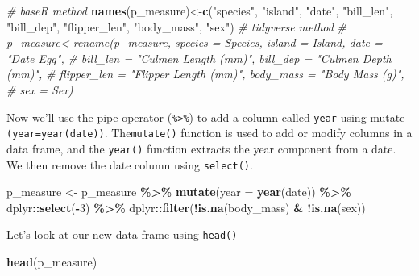 \documentclass[
]{book}
\newenvironment{Shaded}{\begin{snugshade}}{\end{snugshade}}
\newcommand{\AttributeTok}[1]{\textcolor[rgb]{0.13,0.29,0.53}{#1}}
\newcommand{\CommentTok}[1]{\textcolor[rgb]{0.56,0.35,0.01}{\textit{#1}}}
\newcommand{\DecValTok}[1]{\textcolor[rgb]{0.00,0.00,0.81}{#1}}
\newcommand{\FunctionTok}[1]{\textcolor[rgb]{0.13,0.29,0.53}{\textbf{#1}}}
\newcommand{\NormalTok}[1]{#1}
\newcommand{\OtherTok}[1]{\textcolor[rgb]{0.56,0.35,0.01}{#1}}
\newcommand{\SpecialCharTok}[1]{\textcolor[rgb]{0.81,0.36,0.00}{\textbf{#1}}}
\newcommand{\StringTok}[1]{\textcolor[rgb]{0.31,0.60,0.02}{#1}}
\begin{document}
\begin{Shaded}
\begin{Highlighting}[]
\CommentTok{\# baseR method}
\FunctionTok{names}\NormalTok{(p\_measure)}\OtherTok{\textless{}{-}}\FunctionTok{c}\NormalTok{(}\StringTok{"species"}\NormalTok{, }\StringTok{"island"}\NormalTok{, }\StringTok{"date"}\NormalTok{, }\StringTok{"bill\_len"}\NormalTok{, }\StringTok{"bill\_dep"}\NormalTok{, }\StringTok{"flipper\_len"}\NormalTok{, }
                    \StringTok{"body\_mass"}\NormalTok{, }\StringTok{"sex"}\NormalTok{)}
\CommentTok{\# tidyverse method}
\CommentTok{\# p\_measure\textless{}{-}rename(p\_measure, species = Species, island = Island, date = "Date Egg",}
\CommentTok{\#                   bill\_len = "Culmen Length (mm)", bill\_dep = "Culmen Depth (mm)",}
\CommentTok{\#                   flipper\_len = "Flipper Length (mm)", body\_mass = "Body Mass (g)", }
\CommentTok{\#                   sex = Sex)}
\end{Highlighting}
\end{Shaded}

Now we'll use the pipe operator (\texttt{\%\textgreater{}\%}) to add a column called \texttt{year} using mutate \texttt{(year=year(date))}. The\texttt{mutate()} function is used to add or modify columns in a data frame, and the \texttt{year()} function extracts the year component from a date. We then remove the date column using \texttt{select()}.

\begin{Shaded}
\begin{Highlighting}[]
\NormalTok{p\_measure }\OtherTok{\textless{}{-}}\NormalTok{ p\_measure }\SpecialCharTok{\%\textgreater{}\%}
    \FunctionTok{mutate}\NormalTok{(}\AttributeTok{year =} \FunctionTok{year}\NormalTok{(date)) }\SpecialCharTok{\%\textgreater{}\%}
\NormalTok{    dplyr}\SpecialCharTok{::}\FunctionTok{select}\NormalTok{(}\SpecialCharTok{{-}}\DecValTok{3}\NormalTok{) }\SpecialCharTok{\%\textgreater{}\%}
\NormalTok{    dplyr}\SpecialCharTok{::}\FunctionTok{filter}\NormalTok{(}\SpecialCharTok{!}\FunctionTok{is.na}\NormalTok{(body\_mass) }\SpecialCharTok{\&} \SpecialCharTok{!}\FunctionTok{is.na}\NormalTok{(sex))}
\end{Highlighting}
\end{Shaded}

Let's look at our new data frame using \texttt{head()}

\begin{Shaded}
\begin{Highlighting}[]
\FunctionTok{head}\NormalTok{(p\_measure)}
\end{Highlighting}
\end{Shaded}
\end{document}
